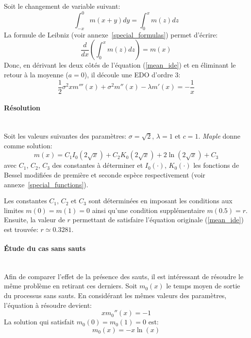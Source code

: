 Soit le changement de variable suivant:
\begin{equation}\label{variable_change_mean}
    \int_{-x}^0m(x+y)dy=\int_0^x m(z)dz
\end{equation}
La formule de Leibniz (voir annexe~\ref{special_formulas}) permet d'écrire:
\[
\frac{d}{dx}\left(\int_0^x m(z)dz\right)=m(x)
\]
Donc, en dérivant les deux côtés de l'équation (\ref{mean_ide}) et en éliminant le retour à la moyenne ($a=0$), il découle une \acs{EDO} d'ordre 3:
\begin{equation}\label{mean_3rd_order}
    \frac{1}{2}\sigma^2xm'''(x)+\sigma^2m''(x)-\lambda m'(x)=-\frac{1}{x}
\end{equation}

\paragraph{Résolution}\phantom{}\\
Soit les valeurs suivantes des paramètres: $\sigma=\sqrt{2}$, $\lambda=1$ et $c=1$. \textit{Maple} donne comme solution:
\begin{equation}\label{sol_mean_with_jumps}
    m(x)=C_1I_0(2\sqrt{x})+C_2K_0(2\sqrt{x})+2\ln(2\sqrt{x})+C_3
\end{equation}
avec $C_1$, $C_2$, $C_3$ des constantes à déterminer et $I_0(\cdot)$, $K_0(\cdot)$ les fonctions de Bessel modifiées de première et seconde espèce respectivement (voir annexe~\ref{special_functions}).

Les constantes $C_1$, $C_2$ et $C_3$ sont déterminées en imposant les conditions aux limites $m(0)=m(1)=0$ ainsi qu'une condition supplémentaire $m(0.5)=r$. Ensuite, la valeur de $r$ permettant de satisfaire l'équation originale (\ref{mean_ide}) est trouvée: $r\simeq0.3281$.

\paragraph{Étude du cas sans sauts}\phantom{}\\
Afin de comparer l'effet de la présence des sauts, il est intéressant de résoudre le même problème en retirant ces derniers. Soit $m_0(x)$ le temps moyen de sortie du processus sans sauts. En considérant les mêmes valeurs des paramètres, l'équation à résoudre devient:
\begin{equation}\label{mean_3rd_order_without_jumps}
    xm_0''(x)=-1
\end{equation}
La solution qui satisfait $m_0(0)=m_0(1)=0$ est:
\begin{equation}\label{sol_mean_with_0_jumps}
    m_0(x)=-x\ln(x)
\end{equation}

